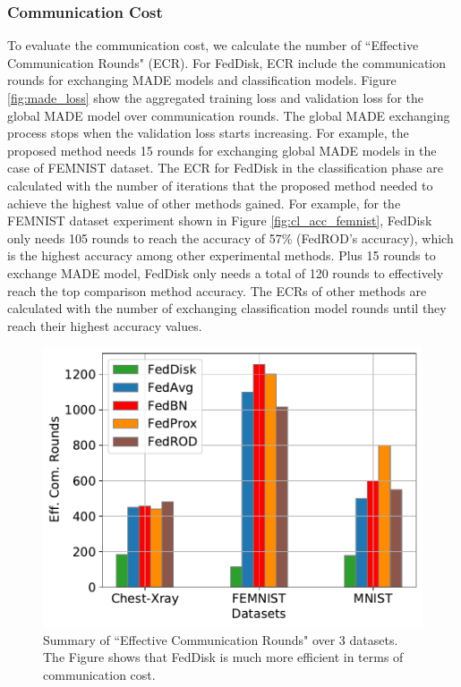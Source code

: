\documentclass[mathfont=newtx]{uai2023} %
\newcommand{\MethodnameShort}{FedDisk}
\begin{document}
\subsubsection{Communication Cost}
To evaluate the communication cost, we calculate the number of ``Effective Communication Rounds" (ECR). For \MethodnameShort{}, ECR include the communication rounds for exchanging MADE models and classification models. Figure \ref{fig:made_loss} show the aggregated training loss and validation loss for the global MADE model over communication rounds. The global MADE exchanging process stops when the validation loss starts increasing. For example, the proposed method needs 15 rounds for exchanging global MADE models in the case of FEMNIST dataset. The ECR for \MethodnameShort{} in the classification phase are calculated with the number of iterations that the proposed method needed to achieve the highest value of other methods gained. For example, for the FEMNIST dataset experiment shown in Figure \ref{fig:cl_acc_femnist}, \MethodnameShort{} only needs 105 rounds to reach the accuracy of 57\% (FedROD's accuracy), which is the highest accuracy among other experimental methods. Plus 15 rounds to exchange MADE model, \MethodnameShort{} only needs a total of 120 rounds to effectively reach the top comparison method accuracy. The ECRs of other methods are calculated with the number of exchanging classification model rounds until they reach their highest accuracy values.  
\begin{figure}[ht!]
	\centering
	\includegraphics[width=0.85\linewidth]{Figures/Com.Rounds}
	\caption{Summary of ``Effective Communication Rounds" over 3 datasets. The Figure shows that \MethodnameShort{} is much more efficient in terms of communication cost.}	
	\label{fig:communication_round}
\end{figure}
\end{document}
